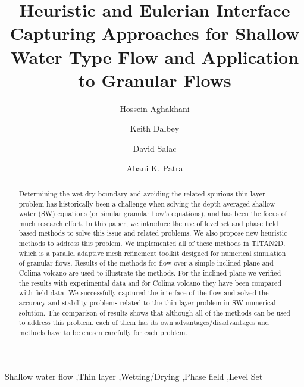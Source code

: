 \documentclass[review]{elsarticle}
\begin{document}
\begin{frontmatter}

\title{Heuristic and Eulerian Interface Capturing Approaches for Shallow Water Type Flow and Application to Granular Flows}


\author[maeaddress]{Hossein Aghakhani}
\author[sandiaaddress]{Keith Dalbey}
\author[maeaddress]{David Salac}
\author[maeaddress]{Abani K. Patra}


\address[maeaddress]{Department of Mechanical and Aerospace Engineering, University at Buffalo, Buffalo, New York, United States}
\address[sandiaaddress]{Sandia National Laboratories, Albuquerque, New Mexico, United States}

\begin{abstract}
Determining the wet-dry boundary and avoiding the related spurious thin-layer problem has historically been a challenge when 
solving the depth-averaged shallow-water (SW) equations (or similar granular flow's equations), and has 
been the focus of much research effort. In this paper, we introduce the use of level set and phase field based methods to solve this issue and related problems. We also propose new heuristic 
methods to address this problem. We implemented all of these methods in TITAN2D, which is a parallel adaptive mesh refinement toolkit designed for numerical simulation of granular flows. 
Results of the methods for flow over a simple inclined plane and Colima volcano are used to illustrate the methods. For the inclined plane we verified the results with experimental data and for 
Colima volcano they have been compared with field data. We successfully captured the interface of the flow and solved the accuracy and stability problems related to the thin layer problem in 
SW numerical solution. The comparison of results shows that although all of the methods can be used to address this problem, 
each of them has its own advantages/disadvantages and methods have to be chosen carefully for each problem. 
\end{abstract}

\begin{keyword}

Shallow water flow \sep Thin layer \sep Wetting/Drying \sep Phase field \sep Level Set

\end{keyword}

\end{frontmatter}
\end{document}
